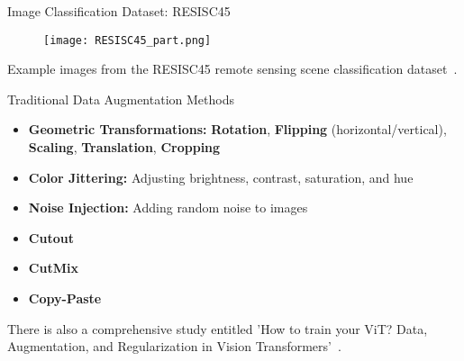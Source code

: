 
\begin{refsection}
  \begin{frame}{Image Classification Dataset: RESISC45}
    \begin{figure}
      \centering
      \texttt{[image: RESISC45\_part.png]}
    \end{figure}
    \scriptsize
    Example images from the RESISC45 remote sensing scene classification dataset~\parencite{Cheng2017}.
    \bottomleftrefs
  \end{frame}
\end{refsection}

\begin{refsection}
  \begin{frame}{Traditional Data Augmentation Methods}
    \begin{itemize}
      \item \textbf{Geometric Transformations:} \textbf{Rotation}, \textbf{Flipping} (horizontal/vertical), \textbf{Scaling}, \textbf{Translation}, \textbf{Cropping}
      \item \textbf{Color Jittering:} Adjusting brightness, contrast, saturation, and hue
      \item \textbf{Noise Injection:} Adding random noise to images
      \item \textbf{Cutout}~\parencite{devriesImprovedRegularizationConvolutional2017}
      \item \textbf{CutMix}~\parencite{yunCutMixRegularizationStrategy2019}
      \item \textbf{Copy-Paste}~\parencite{ghiasiSimpleCopyPasteStrong2021}
    \end{itemize}
    There is also a comprehensive study entitled 'How to train your ViT? Data, Augmentation,  and Regularization in Vision Transformers'~\parencite{steinerHowTrainYour2022}.
    \bottomleftrefs
  \end{frame}
\end{refsection}

